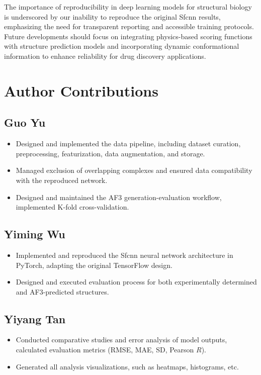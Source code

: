 \documentclass[unnumsec,webpdf,contemporary,large]{oup-authoring-template}
\theoremstyle{thmstyleone}%
\theoremstyle{thmstyletwo}%
\theoremstyle{thmstylethree}%
\begin{document}
The importance of reproducibility in deep learning models for structural biology is underscored 
by our inability to reproduce the original Sfcnn results, emphasizing the need for transparent 
reporting and accessible training protocols. Future developments should focus on integrating 
physics-based scoring functions with structure prediction models and incorporating dynamic 
conformational information to enhance reliability for drug discovery applications.


\section{Author Contributions}

\subsection{Guo Yu}
\begin{itemize}
    \item Designed and implemented the data pipeline, including dataset curation, preprocessing, featurization, data augmentation, and storage.
    \item Managed exclusion of overlapping complexes and ensured data compatibility with the reproduced network.
    \item Designed and maintained the AF3 generation-evaluation workflow, implemented K-fold cross-validation.
\end{itemize}

\subsection{Yiming Wu}
\begin{itemize}
    \item Implemented and reproduced the Sfcnn neural network architecture in PyTorch, adapting the original TensorFlow design.
    \item Designed and executed evaluation process for both experimentally determined and AF3-predicted structures.
\end{itemize}

\subsection{Yiyang Tan}
\begin{itemize}
    \item Conducted comparative studies and error analysis of model outputs, calculated evaluation metrics (RMSE, MAE, SD, Pearson $R$).
    \item Generated all analysis visualizations, such as heatmaps, histograms, etc.
\end{itemize}
\end{document}
